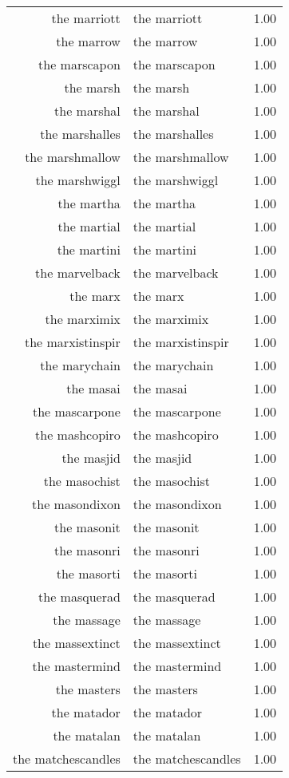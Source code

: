 \begin{table}[ht]
\begin{tabular}{rlr}
  the marriott & the marriott & 1.00 \\ 
  the marrow & the marrow & 1.00 \\ 
  the marscapon & the marscapon & 1.00 \\ 
  the marsh & the marsh & 1.00 \\ 
  the marshal & the marshal & 1.00 \\ 
  the marshalles & the marshalles & 1.00 \\ 
  the marshmallow & the marshmallow & 1.00 \\ 
  the marshwiggl & the marshwiggl & 1.00 \\ 
  the martha & the martha & 1.00 \\ 
  the martial & the martial & 1.00 \\ 
  the martini & the martini & 1.00 \\ 
  the marvelback & the marvelback & 1.00 \\ 
  the marx & the marx & 1.00 \\ 
  the marximix & the marximix & 1.00 \\ 
  the marxistinspir & the marxistinspir & 1.00 \\ 
  the marychain & the marychain & 1.00 \\ 
  the masai & the masai & 1.00 \\ 
  the mascarpone & the mascarpone & 1.00 \\ 
  the mashcopiro & the mashcopiro & 1.00 \\ 
  the masjid & the masjid & 1.00 \\ 
  the masochist & the masochist & 1.00 \\ 
  the masondixon & the masondixon & 1.00 \\ 
  the masonit & the masonit & 1.00 \\ 
  the masonri & the masonri & 1.00 \\ 
  the masorti & the masorti & 1.00 \\ 
  the masquerad & the masquerad & 1.00 \\ 
  the massage & the massage & 1.00 \\ 
  the massextinct & the massextinct & 1.00 \\ 
  the mastermind & the mastermind & 1.00 \\ 
  the masters & the masters & 1.00 \\ 
  the matador & the matador & 1.00 \\ 
  the matalan & the matalan & 1.00 \\ 
  the matchescandles & the matchescandles & 1.00 \\ 

\end{tabular}
\end{table}
